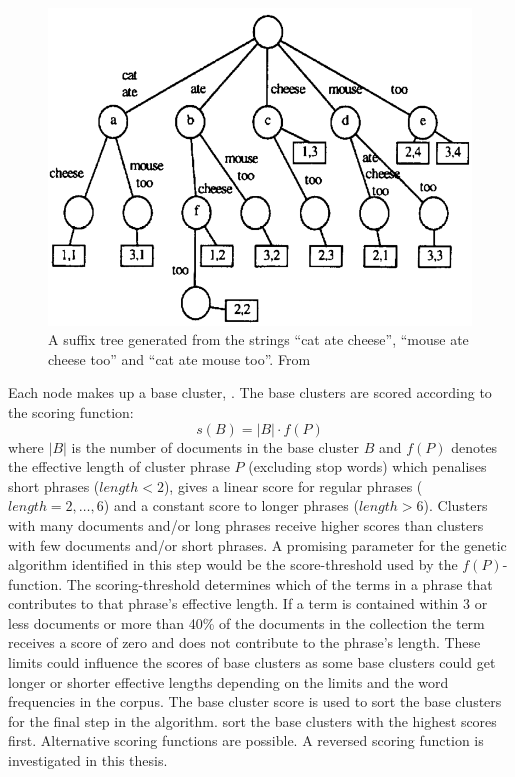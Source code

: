 \begin{figure}[!ht]
  \begin{center}
    \includegraphics[totalheight=0.3\textheight]{Figures/suffixtree}
  \end{center}
  \caption{A suffix tree generated from the strings “cat ate cheese”, “mouse ate cheese too” and “cat ate mouse too”. From  \protect \cite[][48]{Oren1998}}
  \label{fig:suffixtree}
\end{figure}

Each node makes up a base cluster, \parencite{Oren1998}. The base clusters are scored according to the scoring function: 
\begin{displaymath}s(B) = 
\vert B \vert \cdot f(P)
\end{displaymath} 
where \(\vert B \vert\) 
is the number of documents in the base cluster \(B\) and  \(f(P)\) denotes the effective length of cluster phrase \(P\) (excluding stop words) which penalises short phrases (\( length < 2\)), gives a linear score for regular phrases (\(length = {2,\dots,6}\)) and a constant score to longer phrases (\( length > 6\)). Clusters with many documents and/or long phrases receive higher scores than clusters with few documents and/or short phrases. A promising parameter for the genetic algorithm identified in this step would be the score-threshold used by the \(f(P)\)-function. The scoring-threshold determines which of the terms in a phrase that contributes to that phrase's effective length. If a term is contained within 3 or less documents or more than 40\% of the documents in the collection the term receives a score of zero and does not contribute to the phrase's length. These limits could influence the scores of base clusters as some base clusters could get longer or shorter effective lengths depending on the limits and the word frequencies in the corpus. The base cluster score is used to sort the base clusters for the final step in the \STC algorithm. \cite{Oren1998} sort the base clusters with the highest scores first. Alternative scoring functions are possible. A reversed scoring function is investigated in this thesis.

